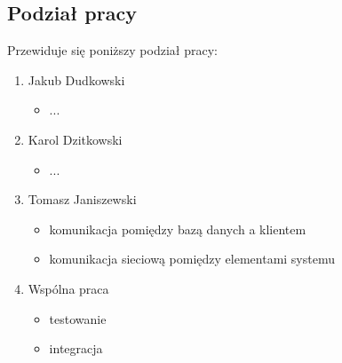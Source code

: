 \documentclass[paper=a4, fontsize=11pt]{scrartcl} %
\numberwithin{equation}{section} %
\numberwithin{figure}{section} %
\numberwithin{table}{section} %
\begin{document}
    \subsection{Podział pracy}
    Przewiduje się poniższy podział pracy:
        \begin{enumerate}
            \item Jakub Dudkowski
                \begin{itemize}
                    \item ...
                \end{itemize}
            \item Karol Dzitkowski
                \begin{itemize}
                    \item ...
                \end{itemize}
            \item Tomasz Janiszewski
                \begin{itemize}
                    \item komunikacja pomiędzy bazą danych a klientem
                    \item komunikacja sieciową pomiędzy elementami systemu
                \end{itemize}
            \item Wspólna praca
                \begin{itemize}
                    \item testowanie
                    \item integracja
                \end{itemize}
        \end{enumerate}
\end{document}
